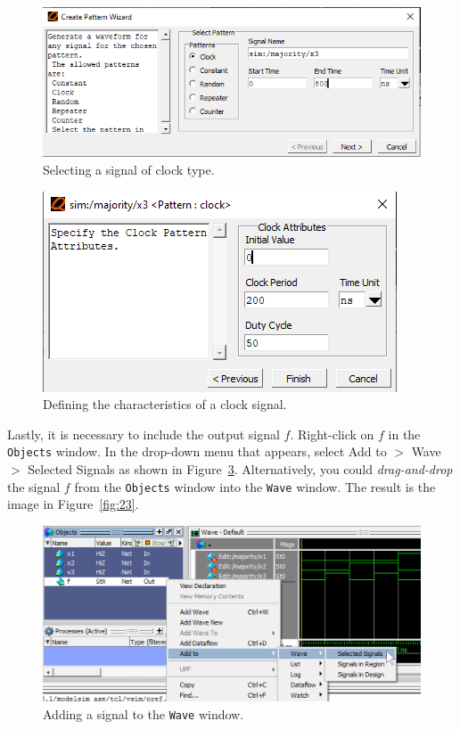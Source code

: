 \documentclass[11pt, twoside, pdftex]{article}
\begin{document}
\begin{figure}[H]
   \begin{center}
      \includegraphics[scale=0.75]{figures/figure20.png}
   \caption{Selecting a signal of clock type.} 
	 \label{fig:20}
	 \end{center}
\end{figure}

\begin{figure}[H]
   \begin{center}
      \includegraphics[scale=0.75]{figures/figure21.png}
   \caption{Defining the characteristics of a clock signal.} 
	 \label{fig:21}
	 \end{center}
\end{figure}

Lastly, it is necessary to include the output signal $f$. Right-click on $f$ in the
\texttt{Objects} window. In the drop-down menu that appears, select
{\sf Add to $>$ Wave $>$ Selected Signals} as shown in Figure~\ref{fig:22}.
Alternatively, you could {\it drag-and-drop} the signal $f$
from the \texttt{Objects} window into the \texttt{Wave} window.
The result is the image in Figure~\ref{fig:23}. 

\begin{figure}[H]
   \begin{center}
      \includegraphics[scale=0.75]{figures/add_selected.png}
       \caption{Adding a signal to the \texttt{Wave} window.} 
	 \label{fig:22}
	 \end{center}
\end{figure}
\end{document}
